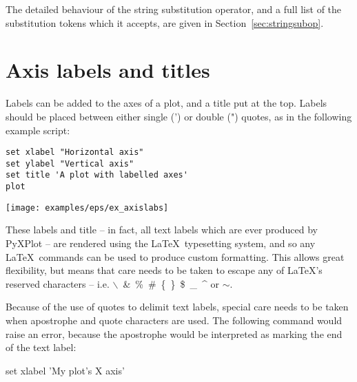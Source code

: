 \vspace{3mm}
\newline
{}\newline
{}\newline
{}\newline
{}
\vspace{3mm}

The detailed behaviour of the string substitution operator, and a full list of
the substitution tokens which it accepts, are given in
Section~\ref{sec:stringsubop}.

\section{Axis labels and titles}
\label{sec:latex_incompatibility}

Labels can be added to the axes of a plot, and a title put at the top.  Labels
should be placed between either single (') or double (") quotes, as in the
following example script:

\begin{verbatim}
set xlabel "Horizontal axis"
set ylabel "Vertical axis"
set title 'A plot with labelled axes'
plot
\end{verbatim}

\begin{center}
\texttt{[image: examples/eps/ex\_axislabs]}
\end{center}

\noindent These labels and title -- in fact, all text labels which are ever
produced by PyXPlot -- are rendered using the \LaTeX\ typesetting system, and
so any \LaTeX\ commands can be used to produce custom formatting. This allows
great flexibility, but means that care needs to be taken to escape any of
\LaTeX's reserved characters -- i.e. $\backslash$~\&~\%~\#~\{~\}~\$~\_~\^{} or
$\sim$.

Because of the use of quotes to delimit text labels, special care needs to be
taken when apostrophe and quote characters are used. The following command
would raise an error, because the apostrophe would be interpreted as marking
the end of the text label:

\begin{dontdo}
set xlabel 'My plot's X axis'
\end{dontdo}

